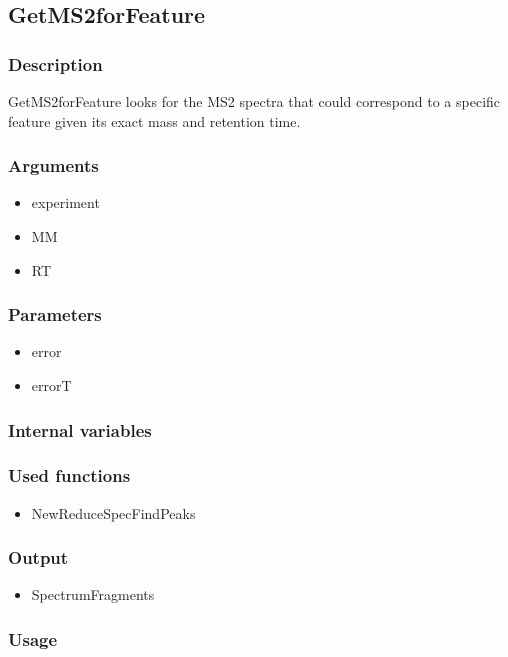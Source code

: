 \subsection{GetMS2forFeature}
\subsubsection{Description}
GetMS2forFeature looks for the MS2 spectra that could correspond to a specific feature given its exact mass and retention time.
\subsubsection{Arguments}
\begin{itemize}
\item experiment
\item MM
\item RT
\end{itemize}
\subsubsection{Parameters}
\begin{itemize}
\item error
\item errorT
\end{itemize}
\subsubsection{Internal variables}
\subsubsection{Used functions}
\begin{itemize}
\item NewReduceSpecFindPeaks
\end{itemize}
\subsubsection{Output}
\begin{itemize}
\item SpectrumFragments %
\end{itemize}
\subsubsection{Usage}


